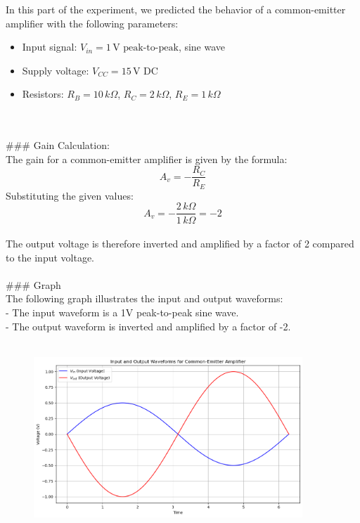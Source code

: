 \documentclass{article}
\begin{document}
In this part of the experiment, we predicted the behavior of a common-emitter amplifier with the following parameters: \\ 
\begin{itemize}
    \item Input signal: \( V_{in} = 1 \, \text{V peak-to-peak} \), sine wave
    \item Supply voltage: \( V_{CC} = 15 \, \text{V DC} \)
    \item Resistors: \( R_B = 10 \, k\Omega \), \( R_C = 2 \, k\Omega \), \( R_E = 1 \, k\Omega \)
\end{itemize}
\\ \\ 
### Gain Calculation: \\ 
The gain for a common-emitter amplifier is given by the formula:\\ 
\[
A_v = - \frac{R_C}{R_E}
\]
Substituting the given values:\\ 
\[
A_v = - \frac{2 \, k\Omega}{1 \, k\Omega} = -2
\]
\\
The output voltage is therefore inverted and amplified by a factor of 2 compared to the input voltage.
\\ \\ 
### Graph\\
The following graph illustrates the input and output waveforms: \\ 
- The input waveform is a 1V peak-to-peak sine wave. \\ 
- The output waveform is inverted and amplified by a factor of -2. \\ 
\\ 
\begin{figure}[H]
    \centering
    \includegraphics[width=0.9\textwidth]{./img/Lab5_6.png}
    \caption{}
    \label{fig:graph1} 
\end{figure}
\\ \\
\end{document}
